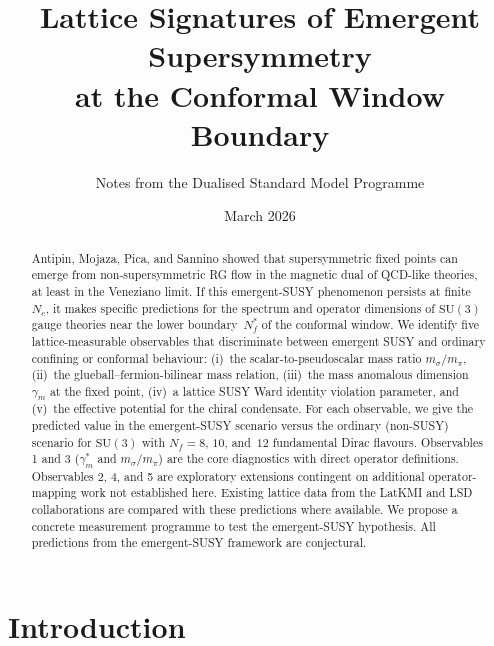 \documentclass[11pt,a4paper]{article}
\theoremstyle{plain}
\theoremstyle{definition}
\theoremstyle{remark}
\newcommand{\Nc}{N_{\!c}}
\newcommand{\Nf}{N_{\!f}}
\newcommand{\Nfstar}{\Nf^*}
\newcommand{\SU}[1]{\mathrm{SU}(#1)}
\begin{document}
\title{\textbf{Lattice Signatures of Emergent Supersymmetry\\
at the Conformal Window Boundary}}
\author{Notes from the Dualised Standard Model Programme}
\date{March 2026}
\maketitle

\begin{abstract}
Antipin, Mojaza, Pica, and Sannino showed that supersymmetric fixed
points can emerge from non-supersymmetric RG flow in the magnetic dual
of QCD-like theories, at least in the Veneziano limit.  If this
emergent-SUSY phenomenon persists at finite~$\Nc$, it makes specific
predictions for the spectrum and operator dimensions of $\SU{3}$
gauge theories near the lower boundary~$\Nfstar$ of the conformal window.
We identify five lattice-measurable observables that discriminate
between emergent SUSY and ordinary confining or conformal behaviour:
(i)~the scalar-to-pseudoscalar mass ratio $m_\sigma / m_\pi$,
(ii)~the glueball--fermion-bilinear mass relation,
(iii)~the mass anomalous dimension~$\gamma_m$ at the fixed point,
(iv)~a lattice SUSY Ward identity violation parameter, and
(v)~the effective potential for the chiral condensate.  For each
observable, we give the predicted value in the emergent-SUSY scenario
versus the ordinary (non-SUSY) scenario for $\SU{3}$ with
$\Nf = 8$, $10$, and~$12$ fundamental Dirac flavours.
Observables 1 and 3 ($\gamma_m^*$ and $m_\sigma/m_\pi$) are the core diagnostics with direct operator definitions.  Observables 2, 4, and 5 are exploratory extensions contingent on additional operator-mapping work not established here.
Existing lattice data from the LatKMI and LSD collaborations are
compared with these predictions where available.  We propose a
concrete measurement programme to test the emergent-SUSY hypothesis.
All predictions from the emergent-SUSY framework are conjectural.
\end{abstract}

\tableofcontents
\newpage


\section{Introduction}
\label{sec:introduction}
\end{document}
